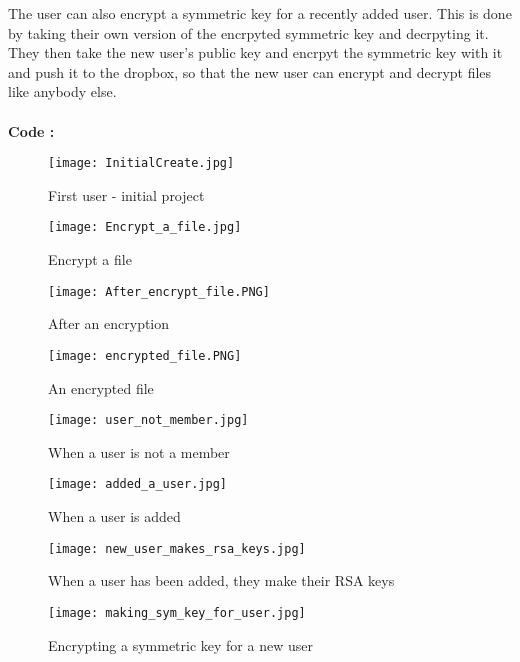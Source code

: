 \documentclass{report}
\begin{document}
    The user can also encrypt a symmetric key for a recently added user. This is done by taking their own version of the encrpyted symmetric key and decrpyting it. They then take the new user's public key and encrpyt the symmetric key with it and push it to the dropbox, so that the new user can encrypt and decrypt files like anybody else.\\\\
    
    
    \textbf{Code : }\\
    
    
    \begin{figure}[h!]
    	\texttt{[image: InitialCreate.jpg]}
    	\caption{First user - initial project}
    \end{figure}
    
    \begin{figure}[h!]
    	\texttt{[image: Encrypt\_a\_file.jpg]}
    	\caption{Encrypt a file}
    \end{figure}
    
    \begin{figure}[h!]
    	\texttt{[image: After\_encrypt\_file.PNG]}
    	\caption{After an encryption}
    \end{figure}

	\begin{figure}[h!]
		\texttt{[image: encrypted\_file.PNG]}
		\caption{An encrypted file}
	\end{figure}
    
    \begin{figure}[h!]
    	\texttt{[image: user\_not\_member.jpg]}
    	\caption{When a user is not a member}
    \end{figure}

	\begin{figure}[h!]
		\texttt{[image: added\_a\_user.jpg]}
		\caption{When a user is added}
	\end{figure}

	\begin{figure}[h!]
		\texttt{[image: new\_user\_makes\_rsa\_keys.jpg]}
		\caption{When a user has been added, they make their RSA keys}
	\end{figure}

 	\begin{figure}[h!]
 		\texttt{[image: making\_sym\_key\_for\_user.jpg]}
 		\caption{Encrypting a symmetric key for a new user}
	\end{figure}  
\end{document}
